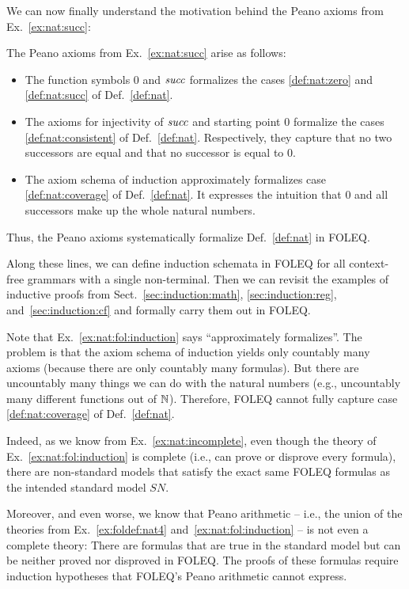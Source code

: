 We can now finally understand the motivation behind the Peano axioms from Ex.~\ref{ex:nat:succ}:

\begin{example}\label{ex:nat:fol:induction}
The Peano axioms from Ex.~\ref{ex:nat:succ} arise as follows:
\begin{itemize}
\item The function symbols $0$ and $\mathit{succ}$ formalizes the cases \ref{def:nat:zero} and \ref{def:nat:succ} of Def.~\ref{def:nat}.
\item The axioms for injectivity of $\mathit{succ}$ and starting point $0$ formalize the cases \ref{def:nat:consistent} of Def.~\ref{def:nat}.
  Respectively, they capture that no two successors are equal and that no successor is equal to $0$.
\item The axiom schema of induction approximately formalizes case \ref{def:nat:coverage} of Def.~\ref{def:nat}.
  It expresses the intuition that $0$ and all successors make up the whole natural numbers.
\end{itemize}
Thus, the Peano axioms systematically formalize Def.~\ref{def:nat} in FOLEQ.
\end{example}

Along these lines, we can define induction schemata in FOLEQ for all context-free grammars with a single non-terminal.
Then we can revisit the examples of inductive proofs from Sect.~\ref{sec:induction:math}, \ref{sec:induction:reg}, and~\ref{sec:induction:cf} and formally carry them out in FOLEQ.

\begin{remark}\label{ex:nat:fol:incomplete}
Note that Ex.~\ref{ex:nat:fol:induction} says ``approximately formalizes''.
The problem is that the axiom schema of induction yields only countably many axioms (because there are only countably many formulas).
But there are uncountably many things we can do with the natural numbers (e.g., uncountably many different functions out of $\mathbb{N}$).
Therefore, FOLEQ cannot fully capture case \ref{def:nat:coverage} of Def.~\ref{def:nat}.

Indeed, as we know from Ex.~\ref{ex:nat:incomplete}, even though the theory of Ex.~\ref{ex:nat:fol:induction} is complete (i.e., can prove or disprove every formula), there are non-standard models that satisfy the exact same FOLEQ formulas as the intended standard model $SN$.

Moreover, and even worse, we know that Peano arithmetic -- i.e., the union of the theories from Ex.~\ref{ex:foldef:nat4} and~\ref{ex:nat:fol:induction} -- is not even a complete theory:
There are formulas that are true in the standard model but can be neither proved nor disproved in FOLEQ.
The proofs of these formulas require induction hypotheses that FOLEQ's Peano arithmetic cannot express.
\end{remark}